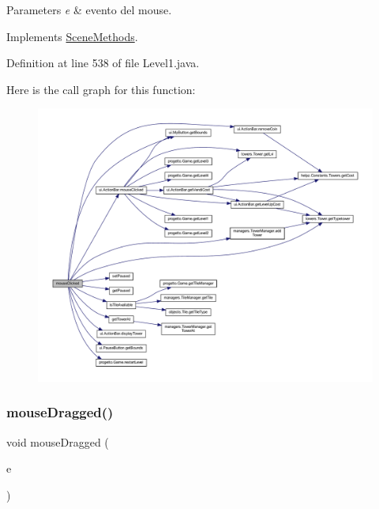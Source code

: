 \begin{DoxyParams}{Parameters}
{\em e} & evento del mouse. \\
\hline
\end{DoxyParams}


Implements \hyperlink{interfacescenes_1_1_scene_methods_a45d56bd84238e8b56589dfc732e2b2cf}{Scene\+Methods}.



Definition at line 538 of file Level1.\+java.

Here is the call graph for this function\+:\nopagebreak
\begin{figure}[H]
\begin{center}
\leavevmode
\includegraphics[width=350pt]{classscenes_1_1_level1_a45d56bd84238e8b56589dfc732e2b2cf_cgraph}
\end{center}
\end{figure}
\mbox{\label{classscenes_1_1_level1_adbfc0588c017133c9b7070474402b72f}} 
\subsubsection{\texorpdfstring{mouse\+Dragged()}{mouseDragged()}}
{\footnotesize\ttfamily void mouse\+Dragged (\begin{DoxyParamCaption}\item[{Mouse\+Event}]{e }\end{DoxyParamCaption})}




